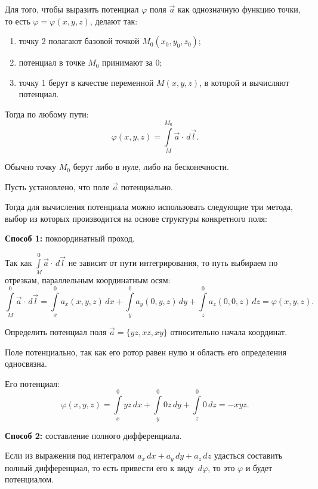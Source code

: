	Для того, чтобы выразить потенциал \( \varphi \) поля \( \vec{a} \) как однозначную функцию точки, то есть \( \varphi = \varphi(x, y, z) \), делают так:
	\begin{enumerate}
	\item точку 2 полагают базовой точкой \( M_0(x_0, y_0, z_0) \);
	\item потенциал в точке \( M_0 \) принимают за 0;
	\item точку 1 берут в качестве переменной \( M(x, y, z) \), в которой и вычисляют потенциал.
	\end{enumerate}
	
	Тогда по любому пути:
	\begin{equation}
		\varphi(x, y, z) = \int\limits_M^{M_0} \vec{a}\cdot\,d\vec{l}. \label{eq6:2.1}
	\end{equation}
	
	Обычно точку \( M_0 \) берут либо в нуле, либо на бесконечности.
	
	Пусть установлено, что поле \( \vec{a} \) потенциально.
	
	Тогда для вычисления потенциала можно использовать следующие три метода, выбор из которых производится на основе структуры конкретного поля:
	
	\textbf{Способ 1:} покоординатный проход.
	
	Так как \( \int\limits_M^0 \vec{a}\cdot\,d\vec{l} \) не зависит от пути интегрирования, то путь выбираем по отрезкам, параллельным координатным осям:
	\[ \int\limits_M^0 \vec{a}\cdot\,d\vec{l} = \int\limits_x^0 a_x(x, y, z)\,d x + \int\limits_y^0 a_y(0, y, z)\,d y + \int\limits_z^0 a_z(0, 0, z)\,d z = \varphi(x, y, z). \]
	
	\begin{example}
	Определить потенциал поля \( \vec{a} = \{ yz, xz, xy \} \) относительно начала координат.
	\end{example}
	\begin{solution}
	
	Поле потенциально, так как его ротор равен нулю и область его определения односвязна.
	
	Его потенциал:
	\[ \varphi(x, y, z) = \int\limits_x^0 yz\,d x + \int\limits_y^0 0z\,d y + \int\limits_z^0 0\,d z = -xyz. \]
	\end{solution}

	\textbf{Способ 2:} составление полного дифференциала.
	
	Если из выражения под интегралом \( a_x\,d x + a_y\,d y + a_z\,d z \) удасться составить полный дифференциал, то есть привести его к виду \( \,d\varphi \), то это \( \varphi \) и будет потенциалом.
	
